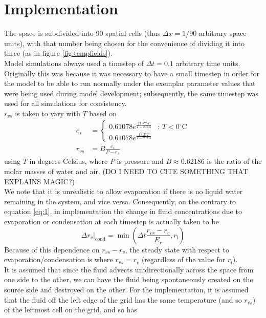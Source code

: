 \documentclass[11pt]{article}
\begin{document}
\section{Implementation}
The space is subdivided into 90 spatial cells (thus $\Delta x=1/90$ arbitrary space units), with that number being chosen for the convenience of dividing it into three (as in figure \ref{fig:tempfields}). \\
Model simulations always used a timestep of $\Delta t=0.1$ arbitrary time units. Originally this was because it was necessary to have a small timestep in order for the model to be able to run normally under the exemplar parameter values that were being used during model development; subsequently, the same timestep was used for all simulations for consistency. \\
$r_{vs}$ is taken to vary with $T$ based on
\begin{align}
e_s &= \begin{cases}
0.61078 e^{\frac{21.875T}{T+265.5}} & \text{: $T<0^{\circ}$C} \\
0.61078 e^{\frac{17.27T}{T+237.3}} &
\end{cases} \label{eq:tetens} \\
r_{vs} &= B\frac{e_s}{P-e_s} \label{eq:magic}
\end{align}
using $T$ in degrees Celsius, where $P$ is pressure and $B\approx0.62186$ is the ratio of the molar masses of water and air. (DO I NEED TO CITE SOMETHING THAT EXPLAINS MAGIC?) \\
We note that it is unrealistic to allow evaporation if there is no liquid water remaining in the system, and vice versa. Consequently, on the contrary to equation \ref{eq:1}, in implementation the change in fluid concentrations due to evaporation or condensation at each timestep is actually taken to be
\begin{equation} \label{eq:2}
\Delta r_v|_{\text{cond}} = \min\left(\Delta t\frac{r_{vs} - r_v}{E_r},r_l\right)
\end{equation}
Because of this dependence on $r_{vs}-r_v$, the steady state with respect to evaporation/condensation is where $r_{vs}=r_v$ (regardless of the value for $r_l$). \\
It is assumed that since the fluid advects unidirectionally across the space from one side to the other, we can have the fluid being spontaneously created on the source side and destroyed on the other. For the implementation, it is assumed that the fluid off the left edge of the grid has the same temperature (and so $r_{vs}$) of the leftmost cell on the grid, and so has
\end{document}
